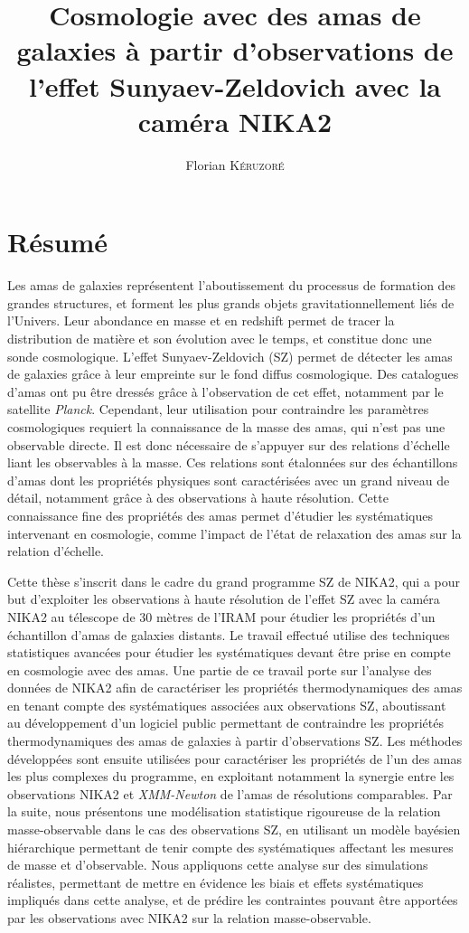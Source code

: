 \documentclass[a4paper, 11pt]{article}
\title{Cosmologie avec des amas de galaxies à partir d'observations de l'effet Sunyaev-Zeldovich avec la caméra NIKA2}
\author{Florian \textsc{K\'eruzor\'e}}
\date{}
\begin{document}

\section*{Résumé}

Les amas de galaxies représentent l'aboutissement du processus de formation des grandes structures, et forment les plus grands objets gravitationnellement liés de l'Univers. Leur abondance en masse et en redshift permet de tracer la distribution de matière et son évolution avec le temps, et constitue donc une sonde cosmologique. L'effet Sunyaev-Zeldovich (SZ) permet de détecter les amas de galaxies grâce à leur empreinte sur le fond diffus cosmologique. Des catalogues d'amas ont pu être dressés grâce à l'observation de cet effet, notamment par le satellite \textit{Planck}. Cependant, leur utilisation pour contraindre les paramètres cosmologiques requiert la connaissance de la masse des amas, qui n'est pas une observable directe. Il est donc nécessaire de s'appuyer sur des relations d'échelle liant les observables à la masse. Ces relations sont étalonnées sur des échantillons d'amas dont les propriétés physiques sont caractérisées avec un grand niveau de détail, notamment grâce à des observations à haute résolution. Cette connaissance fine des propriétés des amas permet d'étudier les systématiques intervenant en cosmologie, comme l'impact de l'état de relaxation des amas sur la relation d'échelle.

Cette thèse s'inscrit dans le cadre du grand programme SZ de NIKA2, qui a pour but d'exploiter les observations à haute résolution de l'effet SZ avec la caméra NIKA2 au télescope de 30 mètres de l'IRAM pour étudier les propriétés d'un échantillon d'amas de galaxies distants. Le travail effectué utilise des techniques statistiques avancées pour étudier les systématiques devant être prise en compte en cosmologie avec des amas. Une partie de ce travail porte sur l'analyse des données de NIKA2 afin de caractériser les propriétés thermodynamiques des amas en tenant compte des systématiques associées aux observations SZ, aboutissant au développement d'un logiciel public permettant de contraindre les propriétés thermodynamiques des amas de galaxies à partir d'observations SZ. Les méthodes développées sont ensuite utilisées pour caractériser les propriétés de l'un des amas les plus complexes du programme, en exploitant notamment la synergie entre les observations NIKA2 et \textit{XMM-Newton} de l'amas de résolutions comparables. Par la suite, nous présentons une modélisation statistique rigoureuse de la relation masse-observable dans le cas des observations SZ, en utilisant un modèle bayésien hiérarchique permettant de tenir compte des systématiques affectant les mesures de masse et d'observable. Nous appliquons cette analyse sur des simulations réalistes, permettant de mettre en évidence les biais et effets systématiques impliqués dans cette analyse, et de prédire les contraintes pouvant être apportées par les observations avec NIKA2 sur la relation masse-observable.
\end{document}
